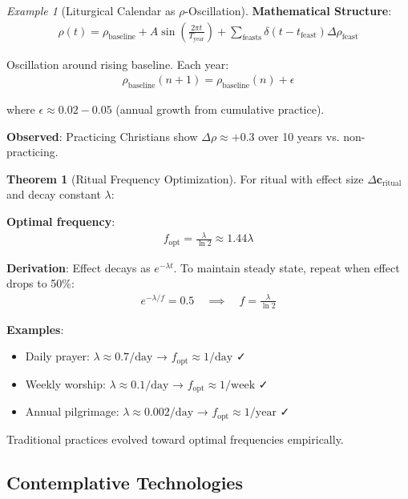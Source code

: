 \documentclass[11pt,a4paper]{article}
\theoremstyle{definition}
\newtheorem{theorem}{Theorem}[section]
\theoremstyle{remark}
\newtheorem{example}{Example}[section]
\newcommand{\cc}{\mathbf{c}}
\begin{document}
\begin{enumerate}
\begin{protocol}
\begin{example}[Liturgical Calendar as \(\rho\)-Oscillation]
\textbf{Mathematical Structure}:
\begin{align}
\rho(t) = \rho_{\text{baseline}} + A\sin\left(\frac{2\pi t}{T_{\text{year}}}\right) + \sum_{\text{feasts}} \delta(t - t_{\text{feast}})\Delta\rho_{\text{feast}}
\end{align}

Oscillation around rising baseline. Each year:
\begin{align}
\rho_{\text{baseline}}(n+1) = \rho_{\text{baseline}}(n) + \epsilon
\end{align}

where \(\epsilon \approx 0.02-0.05\) (annual growth from cumulative practice).

\textbf{Observed}: Practicing Christians show \(\Delta\rho \approx +0.3\) over 10 years vs. non-practicing.
\end{example}

\begin{theorem}[Ritual Frequency Optimization]
For ritual with effect size \(\Delta\cc_{\text{ritual}}\) and decay constant \(\lambda\):

\textbf{Optimal frequency}:
\begin{align}
f_{\text{opt}} = \frac{\lambda}{\ln 2} \approx 1.44\lambda
\end{align}

\textbf{Derivation}: Effect decays as \(e^{-\lambda t}\). To maintain steady state, repeat when effect drops to 50\%:
\begin{align}
e^{-\lambda/f} = 0.5 \quad \implies \quad f = \frac{\lambda}{\ln 2}
\end{align}

\textbf{Examples}:
\begin{itemize}
    \item Daily prayer: \(\lambda \approx 0.7/\text{day}\) → \(f_{\text{opt}} \approx 1/\text{day}\) ✓
    \item Weekly worship: \(\lambda \approx 0.1/\text{day}\) → \(f_{\text{opt}} \approx 1/\text{week}\) ✓
    \item Annual pilgrimage: \(\lambda \approx 0.002/\text{day}\) → \(f_{\text{opt}} \approx 1/\text{year}\) ✓
\end{itemize}

Traditional practices evolved toward optimal frequencies empirically.
\end{theorem}

\subsection{Contemplative Technologies}


\end{protocol}
\end{enumerate}
\end{document}
